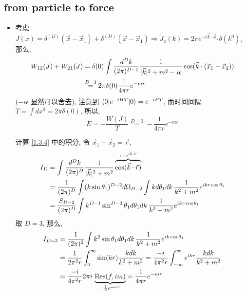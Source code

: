 \subsection{from particle to force}
\begin{itemize}
	\item 考虑 $J(x) = \delta^{(D)}(\vec{x} - \vec{x}_1) + \delta^{(D)}(\vec{x} - \vec{x}_1) \Longrightarrow \tilde{J}_a(k) = 2 \pi e^{- i \vec{k} \cdot \vec{x}_a} \delta(k^0)$, 那么,
	\begin{align}
		W_{1 2}(J) + W_{2 1}(J) &= \delta(0) \int \frac{d^D k}{(2 \pi)^{D - 1}} \frac{1}{|\vec{k}|^2 + m^2 - i \epsilon} \cos(\vec{k} \cdot (\vec{x}_1 - \vec{x}_2)) \notag \\
		&\overset{D = 3}{=} 2 \pi \delta(0) \frac{1}{4 \pi r} e^{- m r} \label{1.3.4}
	\end{align}
	($- i \epsilon$ 显然可以舍去), 注意到 $\braket{0 | e^{- i H T} | 0} = e^{- i E T}$, 而时间间隔 $T = \int dx^0 = 2 \pi \delta(0)$, 所以,
	\begin{equation}
		E = - \frac{W(J)}{T} \overset{D = 3}{=} - \frac{1}{4 \pi r} e^{- m r}
	\end{equation}
	
	\begin{tcolorbox}[title=calculation:]
		计算 \eqref{1.3.4} 中的积分, 令 $\vec{x}_1 - \vec{x}_2 = \vec{r}$,
		\begin{align}
			I_D &= \int \frac{d^D k}{(2 \pi)^D} \frac{1}{|\vec{k}|^2 + m^2} \overbrace{\cos(\vec{k} \cdot \vec{r})}^{\mapsto e^{i \vec{k} \cdot \vec{r}}} \notag \\
			&= \frac{1}{(2 \pi)^D} \int (k \sin \theta_1)^{D - 2} d\Omega_{D - 2} \int k d\theta_1 dk \, \frac{1}{k^2 + m^2} e^{i k r \cos \theta_1} \notag \\
			&= \frac{S_{D - 2}}{(2 \pi)^D} \int k^{D - 1} \sin^{D - 2} \theta_1 d\theta_1 dk \, \frac{1}{k^2 + m^2} e^{i k r \cos \theta_1}
		\end{align}
		取 $D = 3$, 那么,
		\begin{align}
			I_{D = 3} &= \frac{1}{(2 \pi)^2} \int k^2 \sin \theta_1 d\theta_1 dk \, \frac{1}{k^2 + m^2} e^{i k \cos \theta_1} \notag \\
			&= \frac{1}{2 \pi^2 r} \int_0^\infty \sin(k r) \frac{k dk}{k^2 + m^2} = \frac{- i}{4 \pi^2 r} \int_{- \infty}^\infty e^{i k r} \frac{k dk}{k^2 + m^2} \notag \\
			&= \frac{- i}{4 \pi^2 r} 2 \pi i \, \underbrace{\mathrm{Res}(f, i m)}_{= \frac{1}{2} e^{- m r}} = \frac{1}{4 \pi r} e^{- m r}
		\end{align}
	\end{tcolorbox}
\end{itemize}

